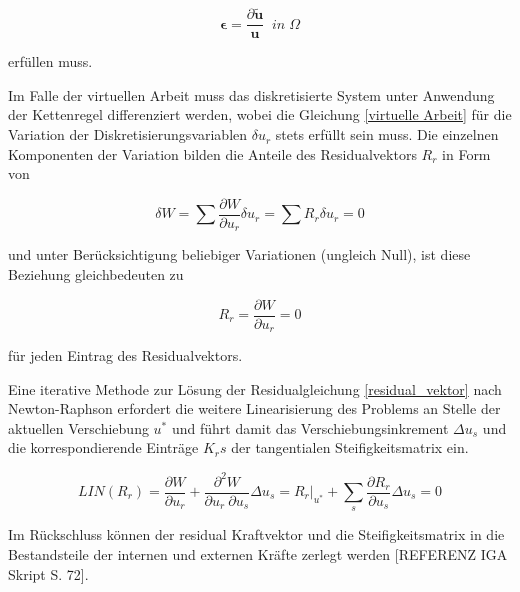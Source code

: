 \documentclass[german,a4paper,12pt,oneside]{scrbook}
\theoremstyle{definition}
\theoremstyle{definition}
\theoremstyle{definition}
\theoremstyle{definition}
\theoremstyle{definition}
\theoremstyle{definition}
\begin{document}
\begin{equation}
    \bm{\epsilon} = \frac{\partial \tilde{\bm{u}}}{\bm{u}}  \; \; in \; \Omega
\end{equation}

\vspace{0.5cm}
erfüllen muss.

\vspace{0.5cm}
Im Falle der virtuellen Arbeit muss das diskretisierte System unter Anwendung der Kettenregel differenziert werden, wobei die Gleichung \eqref{virtuelle Arbeit} für die Variation der Diskretisierungsvariablen $\delta u_r$ stets erfüllt sein muss. Die einzelnen Komponenten der Variation bilden die Anteile des Residualvektors  ${R}_r$ in Form von

\begin{equation}
    \delta W = \sum{\frac{\partial W}{\partial u_r} \delta u_r} 
    = \sum{R_r \delta u_r}  = 0
\end{equation}

\vspace{0.5cm}
und unter Berücksichtigung beliebiger Variationen (ungleich Null), ist diese Beziehung  gleichbedeuten zu 

\begin{equation} \label{residual_vektor}
    R_r = \frac{\partial W}{\partial u_r} = 0
\end{equation}

\vspace{0.5cm}
für jeden Eintrag des Residualvektors.


\vspace{0.5cm}
Eine iterative Methode zur Lösung der Residualgleichung \eqref{residual_vektor} nach Newton-Raphson erfordert die weitere Linearisierung des Problems an Stelle der aktuellen Verschiebung $u^*$  und führt damit das Verschiebungsinkrement $\Delta u_s$ und die korrespondierende Einträge $K_rs$ der tangentialen Steifigkeitsmatrix ein.

\begin{equation}
    LIN(R_r) = 
    \frac{\partial W}{\partial u_r} + 
    \frac{\partial ^2 W }{\partial u_r \: \partial u_s} \Delta u_s = 
    R_r \bigg\rvert_{u^*} + \sum_{s}{\frac{\partial R_r}{\partial u_s} \Delta u_s = 0}
\end{equation}

\vspace{0.5cm}
Im Rückschluss können der residual Kraftvektor und die Steifigkeitsmatrix in die Bestandsteile der internen und externen Kräfte zerlegt werden [REFERENZ IGA Skript S. 72].
\end{document}
